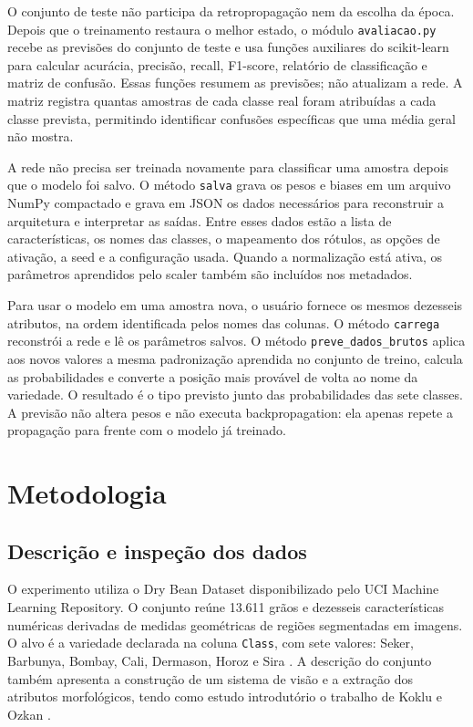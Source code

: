 \documentclass[12pt]{article}
\begin{document}
O conjunto de teste não participa da retropropagação nem da escolha da época. Depois que o treinamento restaura o melhor estado, o módulo \texttt{avaliacao.py} recebe as previsões do conjunto de teste e usa funções auxiliares do scikit-learn para calcular acurácia, precisão, recall, F1-score, relatório de classificação e matriz de confusão. Essas funções resumem as previsões; não atualizam a rede. A matriz registra quantas amostras de cada classe real foram atribuídas a cada classe prevista, permitindo identificar confusões específicas que uma média geral não mostra.

A rede não precisa ser treinada novamente para classificar uma amostra depois que o modelo foi salvo. O método \texttt{salva} grava os pesos e biases em um arquivo NumPy compactado e grava em JSON os dados necessários para reconstruir a arquitetura e interpretar as saídas. Entre esses dados estão a lista de características, os nomes das classes, o mapeamento dos rótulos, as opções de ativação, a seed e a configuração usada. Quando a normalização está ativa, os parâmetros aprendidos pelo scaler também são incluídos nos metadados.

Para usar o modelo em uma amostra nova, o usuário fornece os mesmos dezesseis atributos, na ordem identificada pelos nomes das colunas. O método \texttt{carrega} reconstrói a rede e lê os parâmetros salvos. O método \texttt{preve\_dados\_brutos} aplica aos novos valores a mesma padronização aprendida no conjunto de treino, calcula as probabilidades e converte a posição mais provável de volta ao nome da variedade. O resultado é o tipo previsto junto das probabilidades das sete classes. A previsão não altera pesos e não executa backpropagation: ela apenas repete a propagação para frente com o modelo já treinado.

\section{Metodologia}

\subsection{Descrição e inspeção dos dados}

O experimento utiliza o Dry Bean Dataset disponibilizado pelo UCI Machine Learning Repository. O conjunto reúne 13.611 grãos e dezesseis características numéricas derivadas de medidas geométricas de regiões segmentadas em imagens. O alvo é a variedade declarada na coluna \texttt{Class}, com sete valores: Seker, Barbunya, Bombay, Cali, Dermason, Horoz e Sira \cite{ucibean}. A descrição do conjunto também apresenta a construção de um sistema de visão e a extração dos atributos morfológicos, tendo como estudo introdutório o trabalho de Koklu e Ozkan \cite{koklu2020}.
\end{document}
